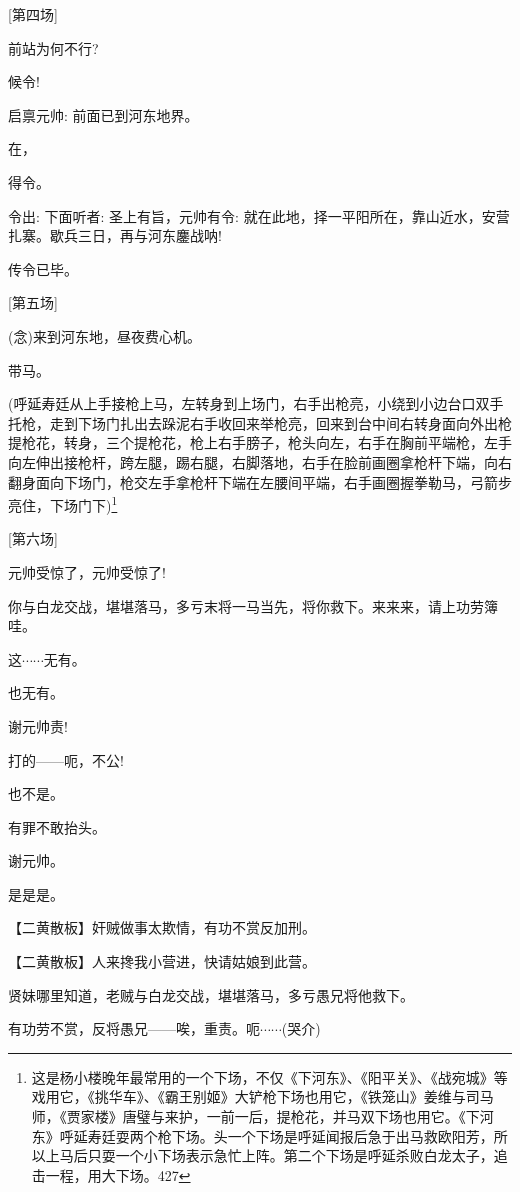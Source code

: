 {{[}第四场{]}}

{前站为何不行?}

{候令!}

{启禀元帅: 前面已到河东地界。}

{在，}

{得令。}

{令出: 下面听者: 圣上有旨，元帅有令: 就在此地，择一平阳所在，靠山近水，安营扎寨。歇兵三日，再与河东鏖战呐!}

{传令已毕。}

{{[}第五场{]}}

{({\akai 念})来到河东地，昼夜费心机。}

{带马。}

{(}呼延寿廷从上手接枪上马，左转身到上场门，右手出枪亮，小绕到小边台口双手托枪，走到下场门扎出去跺泥右手收回来举枪亮，回来到台中间右转身面向外出枪提枪花，转身，三个提枪花，枪上右手膀子，枪头向左，右手在胸前平端枪，左手向左伸出接枪杆，跨左腿，踢右腿，右脚落地，右手在脸前画圈拿枪杆下端，向右翻身面向下场门，枪交左手拿枪杆下端在左腰间平端，右手画圈握拳勒马，弓箭步亮住，下场门下{)}\footnote{ 这是{杨小楼晚年最常用的一个下场}，不仅《下河东》、《阳平关》、《战宛城》等戏用它，《挑华车》、《霸王别姬》大铲枪下场也用它，《铁笼山》姜维与司马师，《贾家楼》唐璧与来护，一前一后，提枪花，并马双下场也用它。《下河东》呼延寿廷耍两个枪下场。头一个下场是呼延闻报后急于出马救欧阳芳，所以上马后只耍一个小下场表示急忙上阵。第二个下场是呼延杀败白龙太子，追击一程，用大下场。{427}}

{{[}第六场{]}}

{元帅受惊了，元帅受惊了!}

{你与白龙交战，堪堪落马，多亏末将一马当先，将你救下。来来来，请上功劳簿哇。}

{这$\cdots{}\cdots{}$无有。}

{也无有。}

{谢元帅责!}

{打的------呃，不公!}

{也不是。}

{有罪不敢抬头。}

{谢元帅。}

{是是是。}

\setlength{\hangindent}{60pt} {【{\akai 二黄散板}】奸贼做事太欺情，有功不赏反加刑。}

\setlength{\hangindent}{60pt} {【{\akai 二黄散板}】人来搀我小营进，快请姑娘到此营。}

{贤妹哪里知道，老贼与白龙交战，堪堪落马，多亏愚兄将他救下。}

{有功劳不赏，反将愚兄------唉，重责。呃$\cdots{}\cdots{}$(哭介)}

